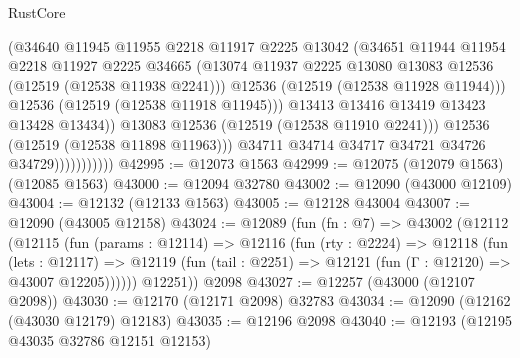 \begin{lexlean}{RustCore}
\begin{coremodule}
                                  (@34640
                                    @11945
                                    @11955
                                    @2218
                                    @11917
                                    @2225
                                    @13042
                                    (@34651
                                      @11944
                                      @11954
                                      @2218
                                      @11927
                                      @2225
                                      @34665
                                      (@13074
                                        @11937
                                        @2225
                                        @13080
                                        @13083
                                        @12536
                                        (@12519 (@12538 @11938 @2241)))
                                      @12536
                                      (@12519 (@12538 @11928 @11944)))
                                    @12536
                                    (@12519 (@12538 @11918 @11945)))
                                  @13413
                                  @13416
                                  @13419
                                  @13423
                                  @13428
                                  @13434))
                              @13083
                              @12536
                              (@12519 (@12538 @11910 @2241)))
                            @12536
                            (@12519 (@12538 @11898 @11963)))
                          @34711
                          @34714
                          @34717
                          @34721
                          @34726
                          @34729)))))))))))
@42995 := @12073 @1563
@42999 := @12075 (@12079 @1563) (@12085 @1563)
@43000 := @12094 @32780
@43002 := @12090 (@43000 @12109)
@43004 := @12132 (@12133 @1563)
@43005 := @12128 @43004
@43007 := @12090 (@43005 @12158)
@43024 := @12089
    (fun (fn : @7) =>
    @43002
      (@12112
        (@12115
          (fun (params : @12114) =>
          @12116
            (fun (rty : @2224) =>
            @12118
              (fun (lets : @12117) =>
              @12119 (fun (tail : @2251) => @12121 (fun (Γ : @12120) => @43007 @12205))))))
        @12251))
    @2098
@43027 := @12257 (@43000 (@12107 @2098))
@43030 := @12170 (@12171 @2098) @32783
@43034 := @12090 (@12162 (@43030 @12179) @12183)
@43035 := @12196 @2098
@43040 := @12193 (@12195 @43035 @32786 @12151 @12153)

\end{coremodule}
\end{lexlean}
